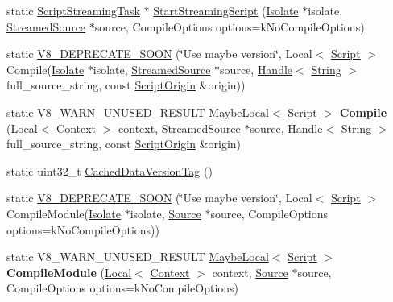 \begin{DoxyCompactItemize}
\item 
static \hyperlink{classv8_1_1_script_compiler_1_1_script_streaming_task}{Script\+Streaming\+Task} $\ast$ \hyperlink{classv8_1_1_script_compiler_a406bb44ef02d644d94bccd3f7b04f2d4}{Start\+Streaming\+Script} (\hyperlink{classv8_1_1_isolate}{Isolate} $\ast$isolate, \hyperlink{classv8_1_1_script_compiler_1_1_streamed_source}{Streamed\+Source} $\ast$source, Compile\+Options options=k\+No\+Compile\+Options)
\item 
static \hyperlink{classv8_1_1_script_compiler_aef0e62712c6d324649fc9d5c545ac080}{V8\+\_\+\+D\+E\+P\+R\+E\+C\+A\+T\+E\+\_\+\+S\+O\+O\+N} (\char`\"{}Use maybe version\char`\"{}, Local$<$ \hyperlink{classv8_1_1_script}{Script} $>$ Compile(\hyperlink{classv8_1_1_isolate}{Isolate} $\ast$isolate, \hyperlink{classv8_1_1_script_compiler_1_1_streamed_source}{Streamed\+Source} $\ast$source, \hyperlink{classv8_1_1_local}{Handle}$<$ \hyperlink{classv8_1_1_string}{String} $>$ full\+\_\+source\+\_\+string, const \hyperlink{classv8_1_1_script_origin}{Script\+Origin} \&origin))
\item 
\hypertarget{classv8_1_1_script_compiler_ac41889cf066e8c697acac3be41c66679}{}static V8\+\_\+\+W\+A\+R\+N\+\_\+\+U\+N\+U\+S\+E\+D\+\_\+\+R\+E\+S\+U\+L\+T \hyperlink{classv8_1_1_maybe_local}{Maybe\+Local}$<$ \hyperlink{classv8_1_1_script}{Script} $>$ {\bfseries Compile} (\hyperlink{classv8_1_1_local}{Local}$<$ \hyperlink{classv8_1_1_context}{Context} $>$ context, \hyperlink{classv8_1_1_script_compiler_1_1_streamed_source}{Streamed\+Source} $\ast$source, \hyperlink{classv8_1_1_local}{Handle}$<$ \hyperlink{classv8_1_1_string}{String} $>$ full\+\_\+source\+\_\+string, const \hyperlink{classv8_1_1_script_origin}{Script\+Origin} \&origin)\label{classv8_1_1_script_compiler_ac41889cf066e8c697acac3be41c66679}

\item 
static uint32\+\_\+t \hyperlink{classv8_1_1_script_compiler_aea78877b0dccde1e587ee1ddeda1c155}{Cached\+Data\+Version\+Tag} ()
\item 
static \hyperlink{classv8_1_1_script_compiler_a08429ae707662767137f56e488f211b0}{V8\+\_\+\+D\+E\+P\+R\+E\+C\+A\+T\+E\+\_\+\+S\+O\+O\+N} (\char`\"{}Use maybe version\char`\"{}, Local$<$ \hyperlink{classv8_1_1_script}{Script} $>$ Compile\+Module(\hyperlink{classv8_1_1_isolate}{Isolate} $\ast$isolate, \hyperlink{classv8_1_1_script_compiler_1_1_source}{Source} $\ast$source, Compile\+Options options=k\+No\+Compile\+Options))
\item 
\hypertarget{classv8_1_1_script_compiler_a42373c4d7c20048db0dd9482410d48d6}{}static V8\+\_\+\+W\+A\+R\+N\+\_\+\+U\+N\+U\+S\+E\+D\+\_\+\+R\+E\+S\+U\+L\+T \hyperlink{classv8_1_1_maybe_local}{Maybe\+Local}$<$ \hyperlink{classv8_1_1_script}{Script} $>$ {\bfseries Compile\+Module} (\hyperlink{classv8_1_1_local}{Local}$<$ \hyperlink{classv8_1_1_context}{Context} $>$ context, \hyperlink{classv8_1_1_script_compiler_1_1_source}{Source} $\ast$source, Compile\+Options options=k\+No\+Compile\+Options)\label{classv8_1_1_script_compiler_a42373c4d7c20048db0dd9482410d48d6}


\end{DoxyCompactItemize}
